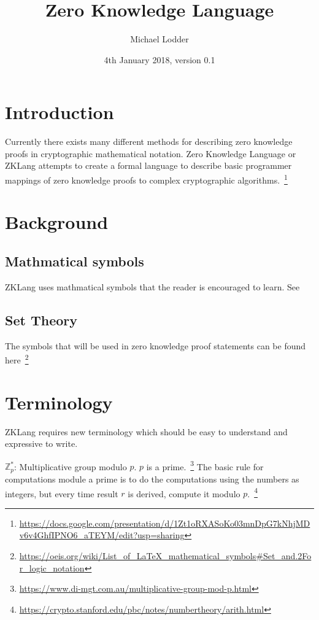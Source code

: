\documentclass[a4paper]{article}
\title{Zero Knowledge Language}
\author{Michael Lodder}
\date{4th January 2018, version 0.1}
\begin{document}
\maketitle

\section{Introduction}

Currently there exists many different methods for describing zero knowledge proofs in cryptographic mathematical notation. Zero Knowledge Language or ZKLang attempts to create a formal language to describe basic programmer mappings of zero knowledge proofs to complex cryptographic algorithms.~\footnote{\url{https://docs.google.com/presentation/d/1Zt1oRXASoKo03mnDpG7kNhjMDv6v4GhfIPNO6_aTEYM/edit?usp=sharing}}

\section{Background}

\subsection{Mathmatical symbols}

ZKLang uses mathmatical symbols that the reader is encouraged to learn. See ~\cite{mathsymbolswiki}

\subsection{Set Theory}

The symbols that will be used in zero knowledge proof statements can be found here~\footnote{\url{https://oeis.org/wiki/List_of_LaTeX_mathematical_symbols\#Set_and.2For_logic_notation}}

\section{Terminology}

ZKLang requires new terminology which should be easy to understand and expressive to write.\newline

\indent $\mathbb{Z}_p^{*}$: Multiplicative group modulo $p$. $p$ is a prime.~\footnote{\url{https://www.di-mgt.com.au/multiplicative-group-mod-p.html}}
The basic rule for computations module a prime is to do the computations using the numbers as integers, but every time result $r$ is derived, compute it modulo $p$.~\footnote{\url{https://crypto.stanford.edu/pbc/notes/numbertheory/arith.html}}\newline
\end{document}
